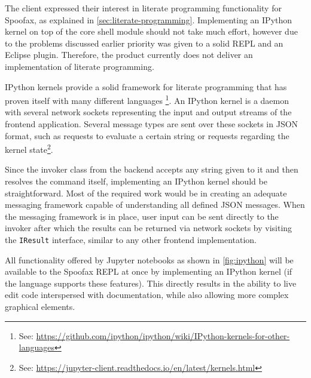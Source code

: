 The client expressed their interest in literate programming functionality for
Spoofax, as explained in \cref{sec:literate-programming}. Implementing an
IPython kernel on top of the core shell module should not take much effort,
however due to the problems discussed earlier priority was given to a solid
REPL and an Eclipse plugin. Therefore, the product currently does not deliver an
implementation of literate programming.

IPython kernels provide a solid framework for literate programming that has
proven itself with many different languages%
\footnote{See: \url{https://github.com/ipython/ipython/wiki/IPython-kernels-for-other-languages}}.
An IPython kernel is a daemon with several network sockets
representing the input and output streams of the frontend application. Several
message types are sent over these sockets in JSON format, such as requests to
evaluate a certain string or requests regarding the kernel
state\footnote{See: \url{https://jupyter-client.readthedocs.io/en/latest/kernels.html}}.

Since the invoker class from the backend accepts any string given to it and then
resolves the command itself, implementing an IPython kernel should be
straightforward. Most of the required work would be in creating an adequate
messaging framework capable of understanding all defined JSON messages. When the
messaging framework is in place, user input can be sent directly to the invoker
after which the results can be returned via network sockets by visiting the
\texttt{IResult} interface, similar to any other frontend implementation.

All functionality offered by Jupyter notebooks as shown in \cref{fig:ipython}
will be available to the Spoofax REPL at once by implementing an IPython kernel
(if the language supports these features). This directly results in the
ability to live edit code interspersed with documentation, while also allowing
more complex graphical elements.

